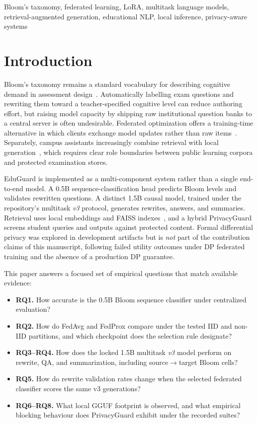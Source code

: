 \documentclass[journal]{IEEEtran}
\begin{document}
\begin{IEEEkeywords}
Bloom's taxonomy, federated learning, LoRA, multitask language models, retrieval-augmented generation, educational NLP, local inference, privacy-aware systems
\end{IEEEkeywords}

\section{Introduction}
Bloom's taxonomy remains a standard vocabulary for describing cognitive demand in assessment design~\cite{bloom1956taxonomy,anderson2001revision}.
Automatically labelling exam questions and rewriting them toward a teacher-specified cognitive level can reduce authoring effort, but raising model capacity by shipping raw institutional question banks to a central server is often undesirable.
Federated optimization offers a training-time alternative in which clients exchange model updates rather than raw items~\cite{mcmahan2017fedavg,li2020fedprox,kairouz2021advances}.
Separately, campus assistants increasingly combine retrieval with local generation~\cite{lewis2020rag}, which requires clear role boundaries between public learning corpora and protected examination stores.

EduGuard is implemented as a multi-component system rather than a single end-to-end model.
A 0.5B sequence-classification head predicts Bloom levels and validates rewritten questions.
A distinct 1.5B causal model, trained under the repository's multitask \emph{v3} protocol, generates rewrites, answers, and summaries.
Retrieval uses local embeddings and FAISS indexes~\cite{johnson2019faiss}, and a hybrid PrivacyGuard screens student queries and outputs against protected content.
Formal differential privacy was explored in development artifacts but is \emph{not} part of the contribution claims of this manuscript, following failed utility outcomes under DP federated training and the absence of a production DP guarantee.

This paper answers a focused set of empirical questions that match available evidence:
\begin{itemize}
  \item \textbf{RQ1.} How accurate is the 0.5B Bloom sequence classifier under centralized evaluation?
  \item \textbf{RQ2.} How do FedAvg and FedProx compare under the tested IID and non-IID partitions, and which checkpoint does the selection rule designate?
  \item \textbf{RQ3--RQ4.} How does the locked 1.5B multitask \emph{v3} model perform on rewrite, QA, and summarization, including source$\rightarrow$target Bloom cells?
  \item \textbf{RQ5.} How do rewrite validation rates change when the selected federated classifier scores the same v3 generations?
  \item \textbf{RQ6--RQ8.} What local GGUF footprint is observed, and what empirical blocking behaviour does PrivacyGuard exhibit under the recorded suites?
\end{itemize}
\end{document}
